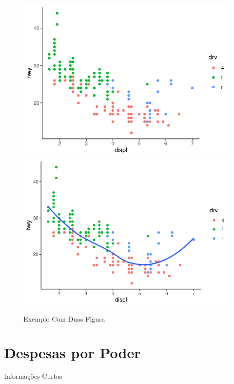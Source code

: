 \begin{figure}[h]
	\caption{Exemplo Com Duas Figura}
	\includegraphics[width=\linewidth]{fig/plot}
	\includegraphics[width=\linewidth]{fig/plot2}
\end{figure}

\section{Despesas por Poder}

\lipsum[1-2]

\begin{smbox}{Informações Curtas}
	\lipsum[1]
\end{smbox}

